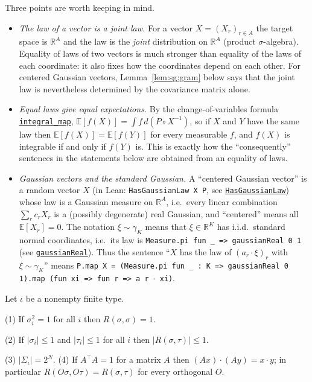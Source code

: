 Three points are worth keeping in mind.
\begin{itemize}
\item \emph{The law of a vector is a joint law.} For a vector $X=(X_r)_{r\in A}$ the target space is $\mathbb R^A$ and the law is the \emph{joint} distribution on $\mathbb R^A$ (product $\sigma$-algebra). Equality of laws of two vectors is much stronger than
equality of the laws of each coordinate: it also fixes how the coordinates depend on each other. For centered Gaussian vectors, Lemma~\ref{lem:sg:gram} below says that the joint law is nevertheless determined by the covariance matrix alone.
\item \emph{Equal laws give equal expectations.} By the change-of-variables formula
\href{https://leanprover-community.github.io/mathlib4_docs/Mathlib/MeasureTheory/Integral/Bochner/Basic.html#MeasureTheory.integral_map}{\texttt{integral\_map}}, $\mathbb E[f(X)]=\int f\,d(P\circ X^{-1})$, so if $X$ and $Y$ have the same law then
$\mathbb E[f(X)]=\mathbb E[f(Y)]$ for every measurable $f$, and $f(X)$ is integrable if and only if $f(Y)$ is. This is exactly how the ``consequently'' sentences in the statements below are obtained from an equality of laws.
\item \emph{Gaussian vectors and the standard Gaussian.} A ``centered Gaussian vector'' is a random vector $X$ (in Lean: \texttt{HasGaussianLaw X P}, see
\href{https://leanprover-community.github.io/mathlib4_docs/Mathlib/Probability/Distributions/Gaussian/HasGaussianLaw/Def.html}{\texttt{HasGaussianLaw}}) whose law is a Gaussian measure on $\mathbb R^A$, i.e.\ every linear combination $\sum_rc_rX_r$ is a (possibly degenerate) real Gaussian, and ``centered'' means all $\mathbb E[X_r]=0$.
The notation $\xi\sim\gamma_K$ means that $\xi\in\mathbb R^K$ has i.i.d.\ standard normal coordinates, i.e.\ its law is
\texttt{Measure.pi fun \_ => gaussianReal 0 1} (see \href{https://leanprover-community.github.io/mathlib4_docs/Mathlib/Probability/Distributions/Gaussian/Real.html#ProbabilityTheory.gaussianReal}{\texttt{gaussianReal}}). Thus the sentence ``$X$ has the law of $(a_r\cdot\xi)_r$ with $\xi\sim\gamma_K$'' means
\texttt{P.map X = (Measure.pi fun \_ : K => gaussianReal 0 1).map (fun xi => fun r => a r}~$\cdot$\texttt{ xi)}.
\end{itemize}

\begin{lemma}\label{lem:sg:overlap}
  \leanok
Let $\iota$ be a nonempty finite type. 

(1) If $\sigma_i^2=1$ for all $i$ then $R(\sigma,\sigma)=1$.

(2) If $|\sigma_i|\le1$ and $|\tau_i|\le1$ for all $i$ then $|R(\sigma,\tau)|\le1$.

(3) $|\Sigma_\iota|=2^N$. (4) If $A^\top A=1$ for a matrix $A$ then $(Ax)\cdot(Ay)=x\cdot y$; in particular
$R(O\sigma,O\tau)=R(\sigma,\tau)$ for every orthogonal $O$.
\end{lemma}

